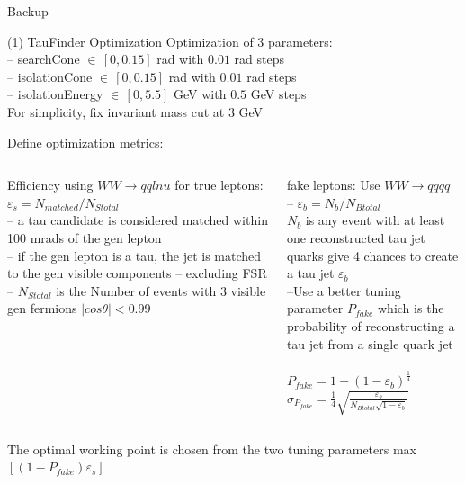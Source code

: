 \documentclass[10pt]{beamer}
\begin{document}
\begin{frame}
Backup
\end{frame}
\begin{frame}{(1) TauFinder Optimization}
Optimization of 3 parameters:\\
-- searchCone $\in \, [0,0.15] $ rad with $0.01 $ rad steps\\
-- isolationCone $\in \, [0,0.15] $ rad with $0.01 $ rad steps\\
-- isolationEnergy $\in \, [0,5.5] $ GeV with $0.5 $ GeV steps \\

For simplicity, fix invariant mass cut at 3 GeV

Define optimization metrics:\\
\begin{columns}
\begin{column}{0.5\textwidth}
Efficiency using $WW\rightarrow qq l nu$ for
true leptons:\\
$\varepsilon_s = N_{matched}/N_{Stotal} $\\
	\scriptsize
	\quad -- a tau candidate is considered matched within 100 mrads of the gen lepton\\ 
	\quad -- if the gen lepton is a tau, the jet is matched to the gen visible components -- excluding FSR
	\quad -- $N_{Stotal}$ is the Number of events with 3 visible gen fermions $|cos\theta |< 0.99$
\end{column}
\begin{column}{0.5\textwidth}
fake leptons:
Use $WW \rightarrow qqqq$ \\
-- $\varepsilon_b = N_b/N_{Btotal}$ \\
	\scriptsize
	$N_b$ is any event with at least one reconstructed tau jet
\quad \quad \\

 quarks give 4 chances to create a tau jet $\varepsilon_b$\\
--Use a better tuning parameter $P_{fake}$ which is the probability of reconstructing a tau jet from a single quark jet\\
\quad \quad \\
$P_{fake} = 1-(1 - \varepsilon_b)^{\frac{1}{4} }$\\
$\sigma_{P_{fake}} = \frac{1}{4} \sqrt{\frac{\varepsilon_b}{N_{Btotal} \sqrt{1-\varepsilon_b}} }$

\end{column}
\end{columns}

The optimal working point is chosen from the two tuning parameters max$[(1-P_{fake}) \varepsilon_s]$
\end{frame}
\end{document}
